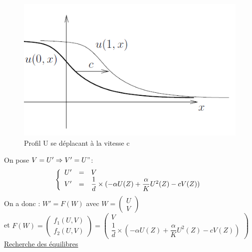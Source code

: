 \documentclass[a4paper,11pt]{article}
\begin{document}
\begin{figure}[H]
	\centering
	\includegraphics[width=0.40\linewidth]{SimulationKPP/FrontOnde}\hfill
	\caption{Profil U se déplacant à la vitesse c}
\end{figure}



On pose $V=U' \Rightarrow V'=U"$:
\[
\left\{
\begin{array}{r c l}
U' &=& V\\
V' &=& \dfrac{1}{d} \times (-\alpha U(Z) + \dfrac{\alpha}{K} U^2(Z)- c V(Z))
\end{array}
\right.
\]
On a donc : $W'=F(W)$ avec $W=\begin{pmatrix} U \\ V \end{pmatrix}$\\ et $F(W)=\begin{pmatrix} f_1(U,V) \\ f_2(U,V) \end{pmatrix}=\begin{pmatrix} V \\ \dfrac{1}{d} \times (-\alpha U(Z) + \dfrac{\alpha}{K} U^2(Z)- c V(Z)) \end{pmatrix}$
\newline
\newline
\underline{Recherche des équilibres}
\end{document}
